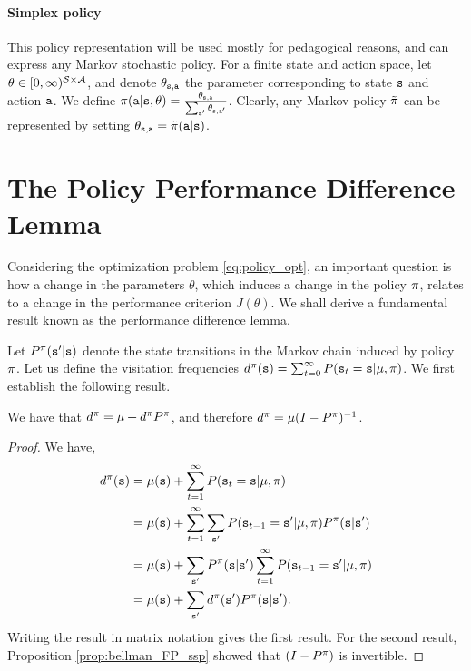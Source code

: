 \paragraph{Simplex policy} This policy representation will be used mostly for pedagogical reasons, and can express any Markov stochastic policy. For a finite state and action space, let $\theta \in [0,\infty)^{\mathcal{S} \times \mathcal{A}}$, and denote $\theta_{{\tt s},{\tt a}}$ the parameter corresponding to state ${\tt s}$ and action ${\tt a}$. We define $\pi({\tt a}|{\tt s},\theta) = \frac{\theta_{{\tt s},{\tt a}}}{\sum_{{\tt a}'} \theta_{{\tt s},{\tt a}'}}$. Clearly, any Markov policy $\tilde{\pi}$ can be represented by setting $\theta_{{\tt s},{\tt a}} = \tilde{\pi}({\tt a}|{\tt s})$.

\section{The Policy Performance Difference Lemma}

Considering the optimization problem \eqref{eq:policy_opt}, an important question is how a change in the parameters $\theta$, which induces a change in the policy $\pi$, relates to a change in the performance criterion $J(\theta)$. We shall derive a fundamental result known as the performance difference lemma.

Let $P^{\pi}({\tt s}' | {\tt s})$ denote the state transitions in the Markov chain induced by policy $\pi$. Let us define the visitation frequencies $d^{\pi}({\tt s}) = \sum_{t=0}^\infty P({\tt s}_t = {\tt s} | \mu, \pi)$. We first establish the following result.
\begin{proposition}\label{prop:visitation_freq}
    We have that $d^{\pi} = \mu + d^{\pi} P^{\pi}$, and therefore $d^{\pi} = \mu (I - P^{\pi})^{-1}$.
\end{proposition}
\begin{proof}
We have,
\begin{equation*}
\begin{split}
        d^{\pi}({\tt s}) &= \mu({\tt s}) + \sum_{t=1}^\infty P({\tt s}_t = {\tt s} | \mu, \pi) \\
        &= \mu({\tt s}) + \sum_{t=1}^\infty \sum_{{\tt s}'} P({\tt s}_{t-1} = {\tt s}' | \mu, \pi) P^{\pi}({\tt s} | {\tt s}')\\
       &= \mu({\tt s}) +  \sum_{{\tt s}'} P^{\pi}({\tt s} | {\tt s}') \sum_{t=1}^\infty P({\tt s}_{t-1} = {\tt s}' | \mu, \pi) \\
        &= \mu({\tt s}) + \sum_{{\tt s}'} d^{\pi}({\tt s}')P^{\pi}({\tt s} | {\tt s}').
\end{split}
\end{equation*}
Writing the result in matrix notation gives the first result. For the second result, Proposition \ref{prop:bellman_FP_ssp} showed that $(I - P^{\pi})$ is invertible. 
\end{proof}

